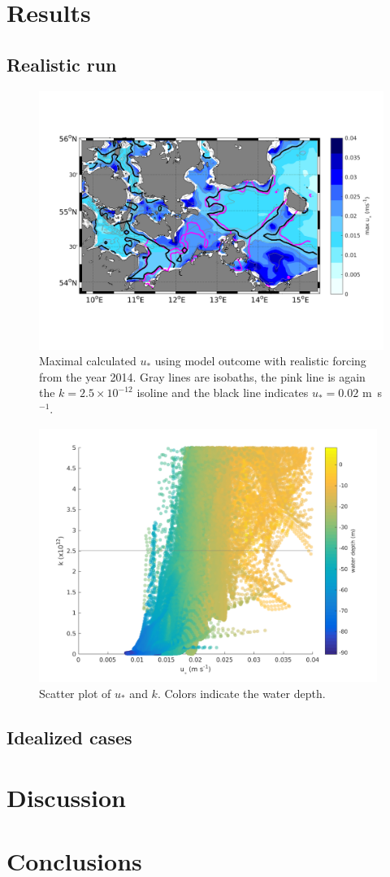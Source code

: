 \section{Results}	

\subsection{Realistic run}
\begin{figure}[ht]
 \includegraphics[width=16cm]{bilder/ubot_real.png}
 \caption{Maximal calculated $u_\ast$ using model outcome with realistic 
forcing from the year 2014. Gray lines are isobaths, the pink line is again the 
$k=2.5\times 10^{-12}$ isoline and the black line indicates $u_\ast = 0.02$ 
m~s$^{-1}$.\label{ustar_real}}
\end{figure}

\begin{figure}[ht]
 \includegraphics[width=11cm]{bilder/scatter_real.png}
 \caption{Scatter plot of $u_\ast$ and $k$. Colors indicate 
the water depth.\label{scatter_real}}
\end{figure}

\subsection{Idealized cases}

\section{Discussion}

\section{Conclusions}